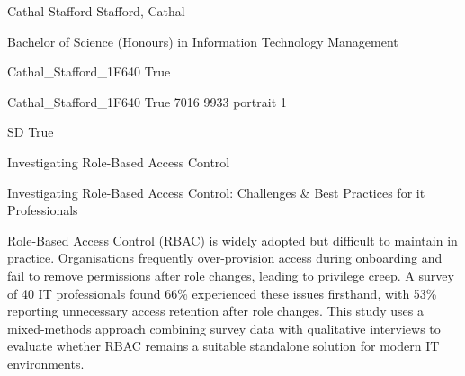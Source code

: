\documentclass[twoside]{report}
\begin{document}
\begingroup{}\relax



\def\Key{Cathal_Stafford_1F640}

{Cathal Stafford}
{Stafford, Cathal}

{Bachelor of Science (Honours) in Information Technology Management}

{Cathal_Stafford_1F640}
{True}

{Cathal_Stafford_1F640}
{True}
{7016}
{9933}
{portrait}
{1}

{SD}
{True}

{Investigating Role-Based Access Control}

{Investigating Role-Based Access Control: Challenges \& Best Practices for it Professionals}

{Role-Based Access Control (RBAC) is widely adopted but difficult to maintain in practice. Organisations frequently over-provision access during onboarding and fail to remove permissions after role changes, leading to privilege creep. A survey of 40 IT professionals found 66\% experienced these issues firsthand, with 53\% reporting unnecessary access retention after role changes. This study uses a mixed-methods approach combining survey data with qualitative interviews to evaluate whether RBAC remains a suitable standalone solution for modern IT environments.}
\end{document}
